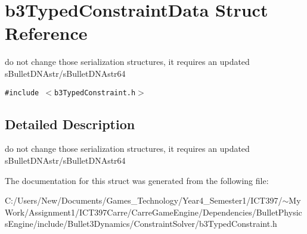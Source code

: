 \hypertarget{structb3_typed_constraint_data}{
\section{b3TypedConstraintData Struct Reference}
\label{structb3_typed_constraint_data}
}
do not change those serialization structures, it requires an updated sBulletDNAstr/sBulletDNAstr64  


{\tt \#include $<$b3TypedConstraint.h$>$}



\subsection{Detailed Description}
do not change those serialization structures, it requires an updated sBulletDNAstr/sBulletDNAstr64 

The documentation for this struct was generated from the following file:\begin{CompactItemize}
\item 
C:/Users/New/Documents/Games\_\-Technology/Year4\_\-Semester1/ICT397/$\sim$My Work/Assignment1/ICT397Carre/CarreGameEngine/Dependencies/BulletPhysicsEngine/include/Bullet3Dynamics/ConstraintSolver/b3TypedConstraint.h\end{CompactItemize}
